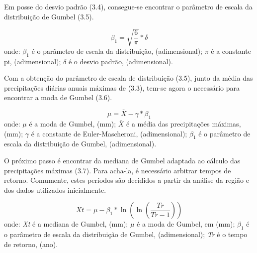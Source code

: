 Em posse do desvio padrão (3.4), consegue-se encontrar o parâmetro de escala da distribuição de Gumbel (3.5).\bigskip

\begin{equation}
\beta_{1} = \sqrt{\frac{6}{\pi}} * \delta
\end{equation}
\newline
onde:
\newline
$\beta_{1}$ é o parâmetro de escala da distribuição, (adimensional);
\newline
$\pi$ é a constante pi, (adimensional);
\newline
$\delta$ é o desvio padrão, (adimensional).\bigskip

Com a obtenção do parâmetro de escala de distribuição (3.5), junto da média das precipitações diárias anuais máximas de (3.3), tem-se agora o necessário para encontrar a moda de Gumbel (3.6).\bigskip

\begin{equation}
\mu = \bar{X} - \gamma * \beta_{1}
\end{equation}
\newline
\newline
onde:
\newline
$\mu$ é a moda de Gumbel, (mm);
\newline
$\bar{X}$ é a média das precipitações máximas, (mm);
\newline
$\gamma$ é a constante de Euler-Mascheroni, (adimensional);
\newline
$\beta_{1}$ é o parâmetro de escala da distribuição de Gumbel, (adimensional).\bigskip

O próximo passo é encontrar da mediana de Gumbel adaptada ao cálculo das precipitações máximas (3.7). Para acha-la, é necessário arbitrar tempos de retorno. Comumente, estes períodos são decididos a partir da análise da região e dos dados utilizados inicialmente.\bigskip

\begin{equation}
Xt = \mu - \beta_{1} * \ln{\left(\ln{\left(\frac{Tr}{Tr - 1}\right)}\right)}
\end{equation}
\newline
onde:
\newline
\textit{Xt} é a mediana de Gumbel, (mm);
\newline
$\mu$ é a moda de Gumbel, em (mm);
\newline
$\beta_{1}$ é o parâmetro de escala da distribuição de Gumbel, (adimensional);
\newline
\textit{Tr} é o tempo de retorno, (ano).\bigskip

